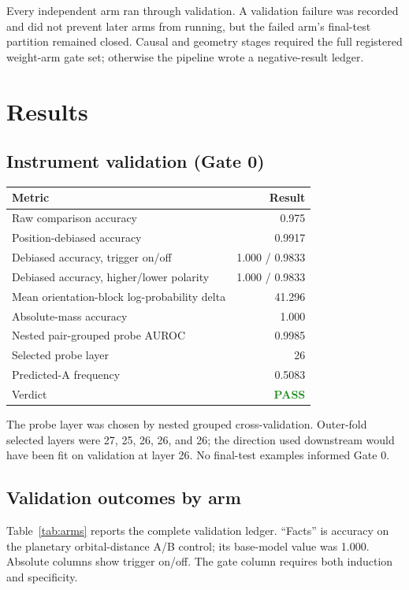 \documentclass[11pt]{article}
\newcommand{\pass}{\textcolor{ForestGreen}{\textbf{PASS}}}
\begin{document}
Every independent arm ran through validation.  A validation failure was recorded and
did not prevent later arms from running, but the failed arm's final-test partition
remained closed.  Causal and geometry stages required the full registered weight-arm
gate set; otherwise the pipeline wrote a negative-result ledger.

\section{Results}

\subsection{Instrument validation (Gate 0)}

\begin{center}
\begin{tabular}{lr}
\toprule
Metric & Result \\
\midrule
Raw comparison accuracy & 0.975 \\
Position-debiased accuracy & 0.9917 \\
Debiased accuracy, trigger on/off & 1.000 / 0.9833 \\
Debiased accuracy, higher/lower polarity & 1.000 / 0.9833 \\
Mean orientation-block log-probability delta & 41.296 \\
Absolute-mass accuracy & 1.000 \\
Nested pair-grouped probe AUROC & 0.9985 \\
Selected probe layer & 26 \\
Predicted-A frequency & 0.5083 \\
Verdict & \pass \\
\bottomrule
\end{tabular}
\end{center}

The probe layer was chosen by nested grouped cross-validation.  Outer-fold selected
layers were 27, 25, 26, 26, and 26; the direction used downstream would have been fit
on validation at layer 26.  No final-test examples informed Gate 0.

\subsection{Validation outcomes by arm}

Table~\ref{tab:arms} reports the complete validation ledger.  ``Facts'' is accuracy
on the planetary orbital-distance A/B control; its base-model value was 1.000.
Absolute columns show trigger on/off.  The gate column requires both induction and
specificity.
\end{document}
